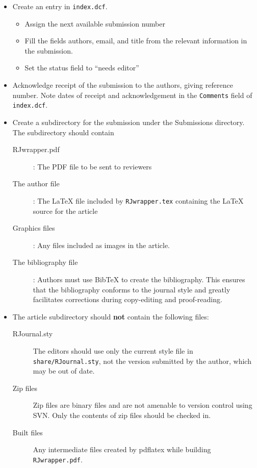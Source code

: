 \documentclass[11pt]{article}
\begin{document}
\begin{itemize}
\item Create an entry in \texttt{index.dcf}.
  \begin{itemize}
  \item Assign the next available submission number 
  \item Fill the  fields authors, email, and title from the relevant
    information in the submission.
  \item Set the status field to ``needs editor''
  \end{itemize}
\item Acknowledge receipt of the submission to the authors, giving
  reference number.  Note dates of receipt and acknowledgement in the
  \texttt{Comments} field of \texttt{index.dcf}.
\item Create a subdirectory for the submission under the Submissions
  directory.  The subdirectory should contain 
  \begin{description}
  \item[RJwrapper.pdf]: The PDF file to be sent to reviewers
  \item[The author file]: The LaTeX file included by \texttt{RJwrapper.tex}
    containing the LaTeX source for the article
  \item[Graphics files]: Any files included as images in the article.
  \item[The bibliography file]: Authors must use BibTeX to create the
    bibliography. This ensures that the bibliography conforms to the 
    journal style and greatly facilitates corrections during copy-editing
    and proof-reading.
  \end{description}
\item The article subdirectory should {\bf not} contain the following files:
  \begin{description}
  \item[RJournal.sty] The editors should use only the current style
    file in \texttt{share/RJournal.sty}, not the version submitted by
    the author, which may be out of date.
  \item[Zip files] Zip files are binary files and are not amenable to
    version control using SVN. Only the contents of zip files should
    be checked in.
  \item[Built files] Any intermediate files created by pdflatex while
    building \texttt{RJwrapper.pdf}.
  \end{description}
\end{itemize}
\end{document}
